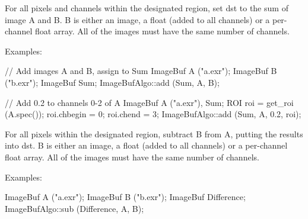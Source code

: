  

For all pixels and channels within the designated region, set
{\cf dst} to the sum of image {\cf A} and {\cf B}.  {\cf B} is either an image,
a float (added to all channels) or a per-channel float array.
All of the images must have the same number of channels.

\smallskip
\noindent Examples:
\begin{code}
    // Add images A and B, assign to Sum
    ImageBuf A ("a.exr");
    ImageBuf B ("b.exr");
    ImageBuf Sum;
    ImageBufAlgo::add (Sum, A, B);

    // Add 0.2 to channels 0-2 of A
    ImageBuf A ("a.exr"), Sum;
    ROI roi = get_roi (A.spec());
    roi.chbegin = 0;  roi.chend = 3;
    ImageBufAlgo::add (Sum, A, 0.2, roi);
\end{code}
\apiend



 

For all pixels within the designated region, subtract {\cf B} from {\cf A},
putting the results into {\cf dst}. {\cf B} is either an image, a float
(added to all channels) or a per-channel float array. All of the images must
have the same number of channels.

\smallskip
\noindent Examples:
\begin{code}
    ImageBuf A ("a.exr");
    ImageBuf B ("b.exr");
    ImageBuf Difference;
    ImageBufAlgo::sub (Difference, A, B);
\end{code}
\apiend



